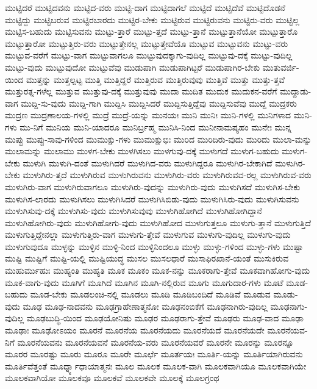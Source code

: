 {ಮುಟ್ಟಿದರೆ
ಮುಟ್ಟಿದವನು
ಮುಟ್ಟಿದ-ವರು
ಮುಟ್ಟಿ-ದಾಗ
ಮುಟ್ಟಿದಾಗಲೆ
ಮುಟ್ಟಿದೆ
ಮುಟ್ಟಿದೆವೆ
ಮುಟ್ಟಿದೊಡನೆ
ಮುಟ್ಟಿದ್ದು
ಮುಟ್ಟಿಬರುವ
ಮುಟ್ಟಿರಬಾರದು
ಮುಟ್ಟಿರ-ಬೇಕು
ಮುಟ್ಟಿರುವ
ಮುಟ್ಟಿರುವನು
ಮುಟ್ಟಿರು-ವರು
ಮುಟ್ಟಿಲ್ಲ
ಮುಟ್ಟಿಸ-ಬಹುದು
ಮುಟ್ಟಿಸುವನು
ಮುಟ್ಟು-ತ್ತಾರೆ
ಮುಟ್ಟು-ತ್ತದೆ
ಮುಟ್ಟು-ತ್ತಾನೆ
ಮುಟ್ಟುತ್ತಾನೆಯೋ
ಮುಟ್ಟುತ್ತಾರೊ
ಮುಟ್ಟುತ್ತಾರೋ
ಮುಟ್ಟುತ್ತಿರು-ವರು
ಮುಟ್ಟುತ್ತೇನಲ್ಲ
ಮುಟ್ಟುತ್ತೇವೆಯೊ
ಮುಟ್ಟುವ
ಮುಟ್ಟುವನು
ಮುಟ್ಟು-ವರು
ಮುಟ್ಟುವ-ವರೆಗೆ
ಮುಟ್ಟು-ವಾಗ
ಮುಟ್ಟುವಾಗಲೂ
ಮುಟ್ಟುವುದಕ್ಕಾಗು-ವುದಿಲ್ಲ
ಮುಟ್ಟುವು-ದಕ್ಕೆ
ಮುಟ್ಟು-ವುದಿಲ್ಲ
ಮುಟ್ಟು-ವುದು
ಮುಟ್ಟುವುದೋ
ಮುಟ್ಟುವೆವು
ಮುಡುಪಾಗಿ
ಮುಡುಪಾಗಿಟ್ಟರೆ
ಮುಡುಪಾಗಿರ-ಬೇಕು
ಮುತುವರ್ಜಿ-ಯಿಂದ
ಮುತ್ತನ್ನು
ಮುತ್ತಲ್ಪಟ್ಟ
ಮುತ್ತಿ
ಮುತ್ತಿದ್ದರೆ
ಮುತ್ತಿರುವ
ಮುತ್ತಿರುವುವು
ಮುತ್ತಿವೆ
ಮುತ್ತು
ಮುತ್ತು-ತ್ತವೆ
ಮುತ್ತುರತ್ನ-ಗಳೆಲ್ಲ
ಮುತ್ತುವ
ಮುತ್ತುವು-ದಕ್ಕೆ
ಮುತ್ತುವುವು
ಮುದಾ
ಮುದಿತ
ಮುದುಕ
ಮುದುಕನ-ವರೆಗೆ
ಮುದ್ದಾಡು-ವಾಗ
ಮುದ್ದಿ-ಸು-ವುದು
ಮುದ್ದಿ-ಗಾಗಿ
ಮುದ್ದಿಸಿ
ಮುದ್ದಿಸಿದರೆ
ಮುದ್ದಿಸುತ್ತಿದ್ದೆವು
ಮುದ್ದಿಸುವೆವು
ಮುದ್ದೆ
ಮುದ್ರಕರು
ಮುದ್ರಣ
ಮುದ್ರಣಾಲಯ-ಗಳಲ್ಲಿ
ಮುದ್ರೆ
ಮುದ್ರೆ-ಯನ್ನು
ಮುನಯಃ
ಮುನಿ
ಮುನಿಃ
ಮುನಿ-ಗಳಲ್ಲಿ
ಮುನಿಗಳಾದ
ಮುನಿ-ಗಳು
ಮು-ನಿಗೆ
ಮುನಿಯ
ಮುನಿ-ಯಾದರೂ
ಮುನಿರ್ಬ್ರಹ್ಮ
ಮುನಿಸಿ-ನಿಂದ
ಮುನೀನಾಮಪ್ಯಹಂ
ಮುನೇಃ
ಮುನ್ನ
ಮುಪ್ಪು
ಮುಪ್ಪು-ಸಾವು-ಗಳಿಂದ
ಮುಮುಕ್ಷು-ಗಳು
ಮುಮುಕ್ಷುಭಿಃ
ಮುರಿದ
ಮುರಿದಿರು-ವುದು
ಮುರಿದು
ಮುಲಾ-ಮನ್ನು
ಮುಲಾಮನ್ನು
ಮುಲಾಮು
ಮುಳಗ-ಬೇಕು
ಮುಳಗಿಸಲು
ಮುಳಗುವು-ದಕ್ಕೆ
ಮುಳುಗದೆ
ಮುಳುಗ-ಬಹುದು
ಮುಳುಗ-ಬೇಕು
ಮುಳುಗಿ
ಮುಳುಗಿ-ದಂತೆ
ಮುಳುಗಿದರೆ
ಮುಳುಗಿದ-ವರು
ಮುಳುಗಿದ್ದರೂ
ಮುಳುಗಿರ-ಬೇಕಾಗಿದೆ
ಮುಳುಗಿರ-ಬೇಕು
ಮುಳುಗಿರು-ತ್ತದೆ
ಮುಳುಗಿರುವ
ಮುಳುಗಿರುವನು
ಮುಳುಗಿರು-ವರು
ಮುಳುಗಿರುವವ-ರಲ್ಲ
ಮುಳುಗಿರುವ-ವರು
ಮುಳುಗಿರು-ವಾಗ
ಮುಳುಗಿರುವಾಗಲೂ
ಮುಳುಗಿರು-ವುದನ್ನು
ಮುಳುಗಿರು-ವುದು
ಮುಳುಗಿಸದೆ
ಮುಳುಗಿಸ-ಬೇಕು
ಮುಳುಗಿಸ-ಲಾರದು
ಮುಳುಗಿಸಲು
ಮುಳುಗಿಸಿದರೆ
ಮುಳುಗಿಸಿಬಿಡು-ವುದು
ಮುಳುಗಿಸಿರು-ವುದು
ಮುಳುಗಿಸುವನು
ಮುಳುಗಿಸುವು-ದಕ್ಕೆ
ಮುಳುಗಿಸು-ವುದು
ಮುಳುಗಿಸುವುವು
ಮುಳುಗಿಹೋಗಿದೆ
ಮುಳುಗಿಹೋಗಿದ್ದಾನೆ
ಮುಳುಗಿಹೋಗಿರು-ವುದು
ಮುಳುಗಿಹೋಗು-ವುದು
ಮುಳುಗಿಹೋದ
ಮುಳುಗುತ್ತಲೂ
ಮುಳುಗು-ತ್ತಾನೆ
ಮುಳುಗುತ್ತಿದೆ
ಮುಳುಗುತ್ತಿದ್ದೇನಲ್ಲಾ
ಮುಳುಗುತ್ತಿರು-ವಾಗ
ಮುಳುಗು-ತ್ತೇವೆ
ಮುಳುಗುವ
ಮುಳುಗು-ವುದಿಲ್ಲ
ಮುಳುಗು-ವುದು
ಮುಳುಗುವುದೂ
ಮುಳ್ಳನ್ನು
ಮುಳ್ಳಿನ
ಮುಳ್ಳಿ-ನಿಂದ
ಮುಳ್ಳಿನಿಂದಲೂ
ಮುಳ್ಳು
ಮುಳ್ಳು-ಗಳಿಂದ
ಮುಳ್ಳು-ಗಳು
ಮುಷ್ಟಾ
ಮುಷ್ಟಿ
ಮುಷ್ಟಿಗೆ
ಮುಷ್ಟಿ-ಯಲ್ಲಿ
ಮುಷ್ಟಿಯುದ್ಧ
ಮುಸಲ
ಮುಸಲಧಾರೆ
ಮುಸಾಫಿರಖಾನೆ-ಯಂತೆ
ಮುಸುಕಿರುವ
ಮುಹುರ್ಮುಹುಃ
ಮುಹ್ಯಂತಿ
ಮುಹ್ಯತಿ
ಮೂಕ
ಮೂಕಂ
ಮೂಕ-ನನ್ನು
ಮೂಕರಾಗು-ತ್ತೇವೆ
ಮೂಕವಾಗಿಹೋಗು-ವುದು
ಮೂಕ-ವಾಗು-ವುದು
ಮೂಗಿಗೆ
ಮೂಗಿದೆ
ಮೂಗಿನ
ಮೂಗಿ-ನಲ್ಲಿರುವ
ಮೂಗು
ಮೂಗುದಾರ-ಗಳು
ಮೂಟೆ
ಮೂಡ-ಬಹುದು
ಮೂಡ-ಬೇಕು
ಮೂಡಲಂಚಿ-ನಲ್ಲಿ
ಮೂಡಲು
ಮೂಡಿ
ಮೂಡಿಬಂದಿದೆ
ಮೂಡಿವೆ
ಮೂಡುವ
ಮೂಡು-ವುದು
ಮೂಢ
ಮೂಢ-ನಾದವನು
ಮೂಢಗ್ರಾಹೇಣಾತ್ಮನೋ
ಮೂಢನಂಬಿಕೆಗೆ
ಮೂಢನಾಗಿರು-ವುದಿಲ್ಲ
ಮೂಢನಾಗು-ವುದಿಲ್ಲ
ಮೂಢಬುದ್ಧಿ-ಯಿಂದ
ಮೂಢಯೋನಿಷು
ಮೂಢರ
ಮೂಢರಾಗು-ತ್ತೇವೆ
ಮೂಢರು
ಮೂಢ-ವಾದ
ಮೂಢಾ
ಮೂಢಾಃ
ಮೂಢೋಽಯಂ
ಮೂರನೆ
ಮೂರನೆಯ
ಮೂರನೆಯದು
ಮೂರನೆಯದೆ
ಮೂರನೆಯದೇ
ಮೂರನೆಯವ-ನಿಗೆ
ಮೂರನೆಯವನು
ಮೂರನೆಯವನೆ
ಮೂರನೆಯ-ವರು
ಮೂರನೆಯವರೆ
ಮೂರನೇ
ಮೂರನ್ನು
ಮೂರನ್ನೂ
ಮೂರರ
ಮೂರಷ್ಟು
ಮೂರು
ಮೂರೂ
ಮೂರೇ
ಮೂರ್ಛೆ
ಮೂರ್ತಯಃ
ಮೂರ್ತಿ-ಯನ್ನು
ಮೂರ್ತಿಯಾಗಿರುವನು
ಮೂರ್ತಿವೆತ್ತಂತೆ
ಮೂರ್ಧ್ನ್ಯಾಧಾಯಾತ್ಮನಃ
ಮೂಲ
ಮೂಲಕ
ಮೂಲಕ-ವಾಗಿ
ಮೂಲಕವಾಗಿಯೂ
ಮೂಲಕವಾಗಿಯೇ
ಮೂಲಕವಾಗಿಯೋ
ಮೂಲಕವೂ
ಮೂಲಕವೆ
ಮೂಲಕವೇ
ಮೂಲಕ್ಕೆ
ಮೂಲಗ್ರಂಥ
}
